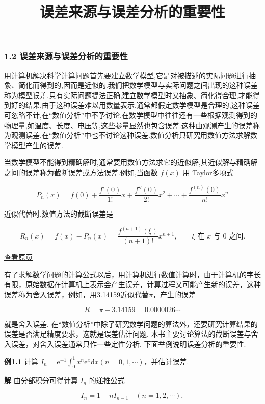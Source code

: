 \documentclass[
  10pt,
  fontset=fandol]{ctexart}
\title{误差来源与误差分析的重要性}
\author{}
\date{}
\begin{document}
\maketitle

\subsubsection{1.2 误差来源与误差分析的重要性}\label{ux8befux5deeux6765ux6e90ux4e0eux8befux5deeux5206ux6790ux7684ux91cdux8981ux6027}

用计算机解决科学计算问题首先要建立数学模型,它是对被描述的实际问题进行抽象、简化而得到的,因而是近似的.我们把数学模型与实际问题之间出现的这种误差称为模型误差.只有实际问题提法正确,建立数学模型时又抽象、简化得合理,才能得到好的结果.由于这种误差难以用数量表示,通常都假定数学模型是合理的,这种误差可忽略不计,在``数值分析''中不予讨论.在数学模型中往往还有一些根据观测得到的物理量,如温度、长度、电压等,这些参量显然也包含误差.这种由观测产生的误差称为观测误差,在``数值分析''中也不讨论这种误差.数值分析只研究用数值方法求解数学模型产生的误差.

当数学模型不能得到精确解时,通常要用数值方法求它的近似解,其近似解与精确解之间的误差称为截断误差或方法误差.例如,当函数 \(f(x)\) 用 Taylor多项式

\[
P_n(x)=f(0)+\frac{f'(0)}{1!}x+\frac{f''(0)}{2!}x^2+\cdots+\frac{f^{(n)}(0)}{n!}x^n
\]

近似代替时,数值方法的截断误差是

\[
R_n(x)=f(x)-P_n(x)=\frac{f^{(n+1)}(\xi)}{(n+1)!}x^{n+1},\qquad \xi\text{ 在 }x\text{ 与 }0\text{ 之间}.
\]

\href{../../source-images/pdf-016.jpeg}{查看原页}

有了求解数学问题的计算公式以后，用计算机进行数值计算时，由于计算机的字长有限，原始数据在计算机上表示会产生误差，计算过程又可能产生新的误差，这种误差称为舍入误差，例如，用3.14159近似代替\(\pi\)，产生的误差

\[
R = \pi - 3.14159 = 0.0000026\cdots
\]

就是舍入误差. 在``数值分析''中除了研究数学问题的算法外，还要研究计算结果的误差是否满足精度要求，这就是误差估计问题. 本书主要讨论算法的截断误差与舍入误差，对舍入误差通常只作一些定性分析. 下面举例说明误差分析的重要性.

\textbf{例1.1} 计算 \(I_n = \mathrm{e}^{-1} \int_{0}^{1} x^n \mathrm{e}^{x} \mathrm{d}x (n = 0,1,\cdots)\)，并估计误差.

\textbf{解} 由分部积分可得计算 \(I_n\) 的递推公式

\[
I_n = 1 - n I_{n-1} \quad (n = 1,2,\cdots), \tag{1.2.1}
\]
\end{document}
